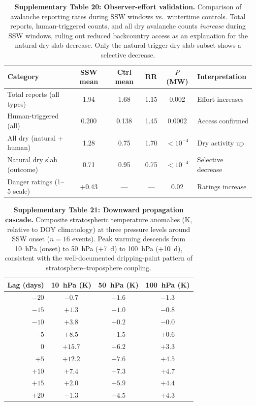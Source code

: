 \begin{table}[!ht]
\centering
\caption{\textbf{Supplementary Table 20: Observer-effort validation.}
Comparison of avalanche reporting rates during SSW windows vs.\ wintertime controls. Total reports, human-triggered counts, and all dry avalanche counts \emph{increase} during SSW windows, ruling out reduced backcountry access as an explanation for the natural dry slab decrease. Only the natural-trigger dry slab subset shows a selective decrease.}
\label{tab:observer}
\small
\begin{tabular}{lccccl}
\toprule
Category & SSW mean & Ctrl mean & RR & $P$ (MW) & Interpretation \\
\midrule
Total reports (all types) & 1.94 & 1.68 & 1.15 & 0.002 & Effort increases \\
Human-triggered (all) & 0.200 & 0.138 & 1.45 & 0.0002 & Access confirmed \\
All dry (natural + human) & 1.28 & 0.75 & 1.70 & $< 10^{-4}$ & Dry activity up \\
Natural dry slab (outcome) & 0.71 & 0.95 & 0.75 & $< 10^{-4}$ & Selective decrease \\
Danger ratings (1--5 scale) & $+0.43$ & --- & --- & 0.02 & Ratings increase \\
\bottomrule
\end{tabular}
\end{table}


\begin{table}[!ht]
\centering
\caption{\textbf{Supplementary Table 21: Downward propagation cascade.}
Composite stratospheric temperature anomalies (K, relative to DOY climatology) at three pressure levels around SSW onset ($n = 16$ events). Peak warming descends from 10~hPa (onset) to 50~hPa (+7~d) to 100~hPa (+10~d), consistent with the well-documented dripping-paint pattern of stratosphere--troposphere coupling.}
\label{tab:propagation_cascade}
\small
\begin{tabular}{rccc}
\toprule
Lag (days) & 10~hPa (K) & 50~hPa (K) & 100~hPa (K) \\
\midrule
$-20$ & $-0.7$ & $-1.6$ & $-1.3$ \\
$-15$ & $+1.3$ & $-1.0$ & $-0.8$ \\
$-10$ & $+3.8$ & $+0.2$ & $-0.0$ \\
$-5$ & $+8.5$ & $+1.5$ & $+0.6$ \\
$0$ & $\mathbf{+15.7}$ & $+6.2$ & $+3.3$ \\
$+5$ & $+12.2$ & $+7.6$ & $+4.5$ \\
$+10$ & $+7.4$ & $+7.3$ & $\mathbf{+4.7}$ \\
$+15$ & $+2.0$ & $+5.9$ & $+4.4$ \\
$+20$ & $-1.3$ & $+4.5$ & $+4.3$ \\
\bottomrule
\end{tabular}
\end{table}

